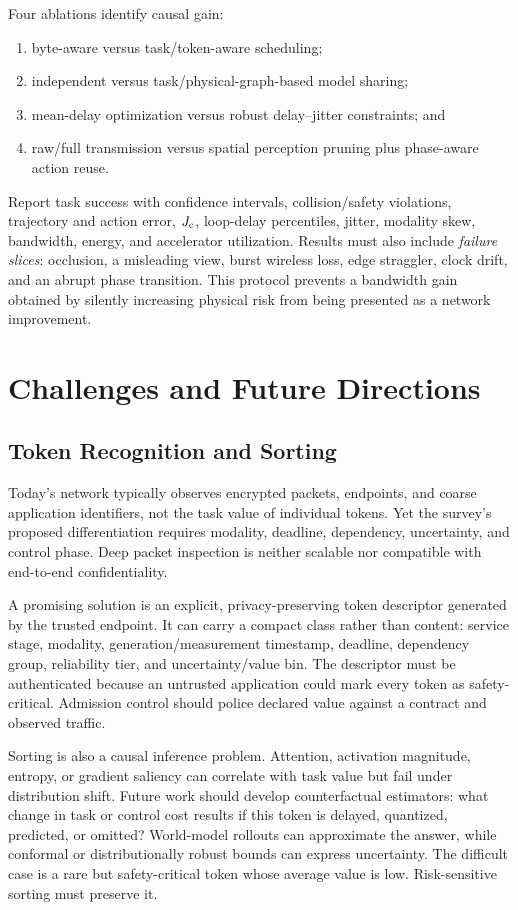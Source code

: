 \documentclass[letterpaper,journal]{IEEEtran}
\begin{document}
Four ablations identify causal gain:
\begin{enumerate}
\item byte-aware versus task/token-aware scheduling;
\item independent versus task/physical-graph-based model sharing;
\item mean-delay optimization versus robust delay--jitter constraints; and
\item raw/full transmission versus spatial perception pruning plus
phase-aware action reuse.
\end{enumerate}
Report task success with confidence intervals, collision/safety violations,
trajectory and action error, $J_{\rm c}$, loop-delay percentiles, jitter,
modality skew, bandwidth, energy, and accelerator utilization. Results must
also include \emph{failure slices}: occlusion, a misleading view, burst
wireless loss, edge straggler, clock drift, and an abrupt phase transition.
This protocol prevents a bandwidth gain obtained by silently increasing
physical risk from being presented as a network improvement.

\section{Challenges and Future Directions}
\label{sec:future}

\subsection{Token Recognition and Sorting}
Today's network typically observes encrypted packets, endpoints, and coarse
application identifiers, not the task value of individual tokens. Yet the
survey's proposed differentiation requires modality, deadline, dependency,
uncertainty, and control phase. Deep packet inspection is neither scalable nor
compatible with end-to-end confidentiality.

A promising solution is an explicit, privacy-preserving token descriptor
generated by the trusted endpoint. It can carry a compact class rather than
content: service stage, modality, generation/measurement timestamp, deadline,
dependency group, reliability tier, and uncertainty/value bin. The descriptor
must be authenticated because an untrusted application could mark every token
as safety-critical. Admission control should police declared value against a
contract and observed traffic.

Sorting is also a causal inference problem. Attention, activation magnitude,
entropy, or gradient saliency can correlate with task value but fail under
distribution shift. Future work should develop counterfactual estimators:
what change in task or control cost results if this token is delayed,
quantized, predicted, or omitted? World-model rollouts can approximate the
answer, while conformal or distributionally robust bounds can express
uncertainty. The difficult case is a rare but safety-critical token whose
average value is low. Risk-sensitive sorting must preserve it.
\end{document}
